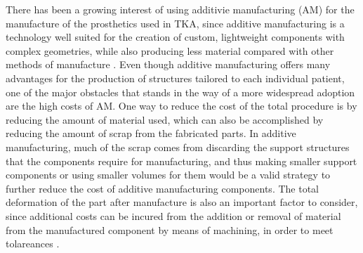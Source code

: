 \documentclass[../main.tex]{subfiles}
\begin{document}
There has been a growing interest of using additivie manufacturing (AM) for the manufacture of the prosthetics used in TKA, since additive manufacturing is a technology well suited for the creation of custom, lightweight components with complex geometries, while also producing less material compared with other methods of manufacture \cite{narraAdditiveManufacturingTotal2019}. Even though additive manufacturing offers many advantages for the production of structures tailored to each individual patient, one of the major obstacles that stands in the way of a more widespread adoption are the high costs of AM. One way to reduce the cost of the total procedure is by reducing the amount of material used, which can also be accomplished by reducing the amount of scrap from the fabricated parts.  In additive manufacturing, much of the scrap comes from discarding the support structures that the components require for manufacturing, and thus making smaller support components or using smaller volumes for them would be a valid strategy to further reduce the cost of additive manufacturing components. The total deformation of the part after manufacture is also an important factor to consider, since additional costs can be incured from the addition or removal of material from the manufactured component by means of machining, in order to meet tolareances \cite{narraAdditiveManufacturingTotal2019}. 
\end{document}
